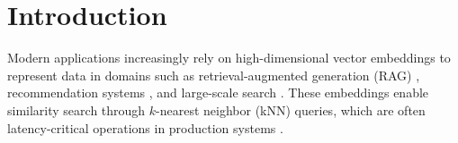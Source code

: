 \documentclass[sigconf,review,anonymous]{acmart}
\begin{document}



\maketitle

\section{Introduction}

Modern applications increasingly rely on high-dimensional vector embeddings to represent data in domains such as retrieval-augmented generation (RAG) \cite{lewis2020retrieval, gao2023retrieval}, recommendation systems \cite{rajput2023recommender, okura2017embedding}, and large-scale search \cite{johnson2019billion, gordo2016deep}. These embeddings enable similarity search through $k$-nearest neighbor (kNN) queries, which are often latency-critical operations in production systems \cite{jayaram2019diskann, singh2021freshdiskann}.
\end{document}
